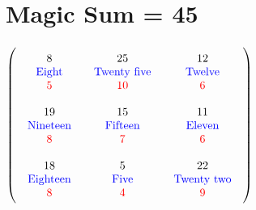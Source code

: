 \documentclass{article}
\begin{document}
\section{Magic Sum = 45}$ \left( \begin{array}{ccc}
\begin{array}{c}
\rule{0pt}{1.5em}8 \\ 
\text{\color{blue}Eight} \\ 
\color{red}5 \vspace{.5em} 
\end{array} & \begin{array}{c}
\rule{0pt}{1.5em}25 \\ 
\text{\color{blue}Twenty five} \\ 
\color{red}10 \vspace{.5em} 
\end{array} & \begin{array}{c}
\rule{0pt}{1.5em}12 \\ 
\text{\color{blue}Twelve} \\ 
\color{red}6 \vspace{.5em} 
\end{array}\\ 
\begin{array}{c}
\rule{0pt}{1.5em}19 \\ 
\text{\color{blue}Nineteen} \\ 
\color{red}8 \vspace{.5em} 
\end{array} & \begin{array}{c}
\rule{0pt}{1.5em}15 \\ 
\text{\color{blue}Fifteen} \\ 
\color{red}7 \vspace{.5em} 
\end{array} & \begin{array}{c}
\rule{0pt}{1.5em}11 \\ 
\text{\color{blue}Eleven} \\ 
\color{red}6 \vspace{.5em} 
\end{array}\\ 
\begin{array}{c}
\rule{0pt}{1.5em}18 \\ 
\text{\color{blue}Eighteen} \\ 
\color{red}8 \vspace{.5em} 
\end{array} & \begin{array}{c}
\rule{0pt}{1.5em}5 \\ 
\text{\color{blue}Five} \\ 
\color{red}4 \vspace{.5em} 
\end{array} & \begin{array}{c}
\rule{0pt}{1.5em}22 \\ 
\text{\color{blue}Twenty two} \\ 
\color{red}9 \vspace{.5em} 
\end{array}\end{array} \right) $
\end{document}
